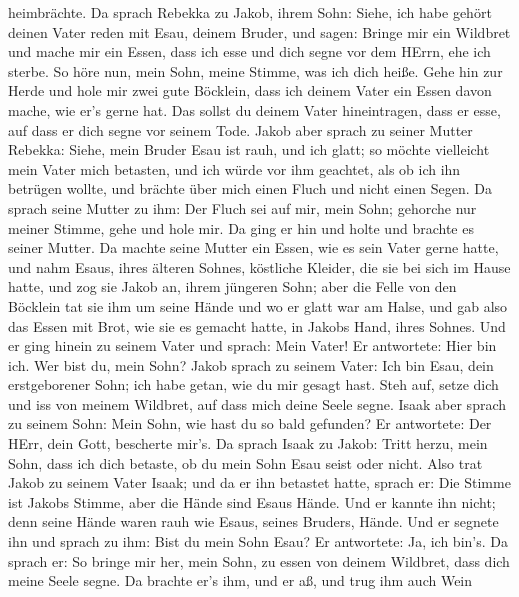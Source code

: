 heimbrächte.  Da sprach Rebekka zu Jakob, ihrem Sohn: Siehe,
ich habe gehört deinen Vater reden mit Esau, deinem Bruder, und sagen:
 Bringe mir ein Wildbret und mache mir ein Essen, dass ich
esse und dich segne vor dem HErrn, ehe ich sterbe.  So höre
nun, mein Sohn, meine Stimme, was ich dich heiße.  Gehe hin
zur Herde und hole mir zwei gute Böcklein, dass ich deinem Vater ein
Essen davon mache, wie er's gerne hat.  Das sollst du
deinem Vater hineintragen, dass er esse, auf dass er dich segne vor
seinem Tode.  Jakob aber sprach zu seiner Mutter Rebekka:
Siehe, mein Bruder Esau ist rauh, und ich glatt;  so möchte
vielleicht mein Vater mich betasten, und ich würde vor ihm geachtet, als
ob ich ihn betrügen wollte, und brächte über mich einen Fluch und nicht
einen Segen.  Da sprach seine Mutter zu ihm: Der Fluch sei
auf mir, mein Sohn; gehorche nur meiner Stimme, gehe und hole mir.
 Da ging er hin und holte und brachte es seiner Mutter. Da
machte seine Mutter ein Essen, wie es sein Vater gerne hatte,
 und nahm Esaus, ihres älteren Sohnes, köstliche Kleider,
die sie bei sich im Hause hatte, und zog sie Jakob an, ihrem jüngeren
Sohn;  aber die Felle von den Böcklein tat sie ihm um seine
Hände und wo er glatt war am Halse,  und gab also das Essen
mit Brot, wie sie es gemacht hatte, in Jakobs Hand, ihres Sohnes.
 Und er ging hinein zu seinem Vater und sprach: Mein Vater!
Er antwortete: Hier bin ich. Wer bist du, mein Sohn?  Jakob
sprach zu seinem Vater: Ich bin Esau, dein erstgeborener Sohn; ich habe
getan, wie du mir gesagt hast. Steh auf, setze dich und iss von meinem
Wildbret, auf dass mich deine Seele segne.  Isaak aber
sprach zu seinem Sohn: Mein Sohn, wie hast du so bald gefunden? Er
antwortete: Der HErr, dein Gott, bescherte mir's.  Da
sprach Isaak zu Jakob: Tritt herzu, mein Sohn, dass ich dich betaste, ob
du mein Sohn Esau seist oder nicht.  Also trat Jakob zu
seinem Vater Isaak; und da er ihn betastet hatte, sprach er: Die Stimme
ist Jakobs Stimme, aber die Hände sind Esaus Hände.  Und er
kannte ihn nicht; denn seine Hände waren rauh wie Esaus, seines Bruders,
Hände. Und er segnete ihn  und sprach zu ihm: Bist du mein
Sohn Esau? Er antwortete: Ja, ich bin's.  Da sprach er: So
bringe mir her, mein Sohn, zu essen von deinem Wildbret, dass dich meine
Seele segne. Da brachte er's ihm, und er aß, und trug ihm auch Wein
